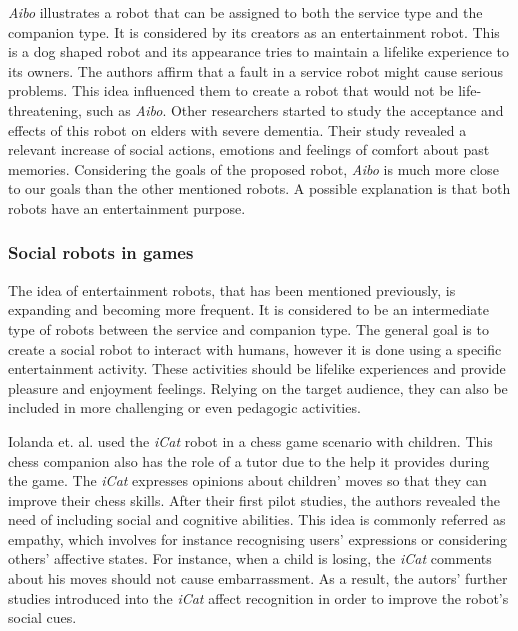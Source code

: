 \emph{Aibo} illustrates a robot that can be assigned to both the service type and the companion type.
It is considered by its creators as an entertainment robot.
This is a dog shaped robot and its appearance tries to maintain a lifelike experience to its owners.
The authors affirm that a fault in a service robot might cause serious problems.
This idea influenced them to create a robot that would not be life-threatening, such as \emph{Aibo}.
Other researchers started to study the acceptance and effects of this robot on elders with severe dementia.
Their study revealed a relevant increase of social actions, emotions and feelings of comfort about past memories.
Considering the goals of the proposed robot, \emph{Aibo} is much more close to our goals than the other mentioned robots.
A possible explanation is that both robots have an entertainment purpose.



\subsubsection{Social robots in games}

The idea of entertainment robots, that has been mentioned previously, is expanding and becoming more frequent.
It is considered to be an intermediate type of robots between the service and companion type.
The general goal is to create a social robot to interact with humans, however it is done using a specific entertainment activity.
These activities should be lifelike experiences and provide pleasure and enjoyment feelings.
Relying on the target audience, they can also be included in more challenging or even pedagogic activities.

Iolanda et. al. used the \emph{iCat} robot in a chess game scenario with children.
This chess companion also has the role of a tutor due to the help it provides during the game.
The \emph{iCat} expresses opinions about children' moves so that they can improve their chess skills.
After their first pilot studies, the authors revealed the need of including social and cognitive abilities.
This idea is commonly referred as empathy, which involves for instance recognising users' expressions or considering others' affective states.
For instance, when a child is losing, the \emph{iCat} comments about his moves should not cause embarrassment.
As a result, the autors' further studies introduced into the \emph{iCat} affect recognition in order to improve the robot's social cues.


